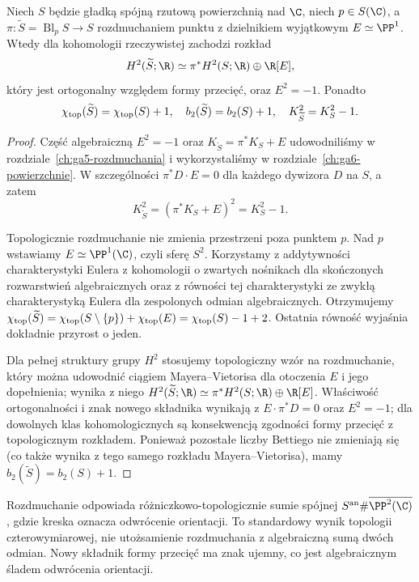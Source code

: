 \begin{twierdzenie}
\label{tw:ga10-blowup}
Niech $S$ będzie gładką spójną rzutową powierzchnią nad $\C$,
niech $p\in S(\C)$, a $\pi\colon\widetilde S=\operatorname{Bl}_pS\to S$
rozdmuchaniem punktu z dzielnikiem wyjątkowym $E\simeq\PP^1$.
Wtedy dla kohomologii rzeczywistej zachodzi rozkład
\[
 H^2(\widetilde S;\R)\simeq\pi^*H^2(S;\R)\oplus\R[E],
\]
który jest ortogonalny względem formy przecięć, oraz
$E^2=-1$. Ponadto
\[
 \chi_{\rm top}(\widetilde S)=\chi_{\rm top}(S)+1,
 \quad b_2(\widetilde S)=b_2(S)+1,
 \quad K_{\widetilde S}^2=K_S^2-1.
\]
\end{twierdzenie}
\begin{proof}
Część algebraiczną $E^2=-1$ oraz
$K_{\widetilde S}=\pi^*K_S+E$ udowodniliśmy
w rozdziale~\ref{ch:ga5-rozdmuchania} i
wykorzystaliśmy w rozdziale~\ref{ch:ga6-powierzchnie}.
W szczególności $\pi^*D\cdot E=0$ dla każdego
dywizora $D$ na $S$, a zatem
\[
 K_{\widetilde S}^2=(\pi^*K_S+E)^2=K_S^2-1.
\]

Topologicznie rozdmuchanie nie zmienia przestrzeni poza
punktem $p$. Nad $p$ wstawiamy $E\simeq\PP^1(\C)$,
czyli sferę $S^2$. Korzystamy z addytywności charakterystyki Eulera
z kohomologii o zwartych nośnikach dla skończonych
rozwarstwień algebraicznych oraz z równości tej
charakterystyki ze zwykłą charakterystyką Eulera
dla zespolonych odmian algebraicznych. Otrzymujemy
$\chi_{\rm top}(\widetilde S)
=\chi_{\rm top}(S\setminus\{p\})+\chi_{\rm top}(E)
=\chi_{\rm top}(S)-1+2$.
Ostatnia równość wyjaśnia dokładnie przyrost o jeden.

Dla pełnej struktury grupy $H^2$ stosujemy topologiczny
wzór na rozdmuchanie, który można udowodnić
ciągiem Mayera--Vietorisa dla otoczenia $E$
i jego dopełnienia; wynika z niego
$H^2(\widetilde S;\R)\simeq\pi^*H^2(S;\R)\oplus\R[E]$.
Właściwość ortogonalności i znak nowego składnika
wynikają z $E\cdot\pi^*D=0$ oraz $E^2=-1$;
dla dowolnych klas kohomologicznych są konsekwencją
zgodności formy przecięć z topologicznym rozkładem.
Ponieważ pozostałe liczby Bettiego nie zmieniają się
(co także wynika z tego samego rozkładu Mayera--Vietorisa),
mamy $b_2(\widetilde S)=b_2(S)+1$.
\end{proof}

\begin{uwaga}
Rozdmuchanie odpowiada różniczkowo-topologicznie sumie
spójnej $S^{\rm an}\#\overline{\PP^2(\C)}$,
gdzie kreska oznacza odwrócenie orientacji.
To standardowy wynik topologii czterowymiarowej,
nie utożsamienie rozdmuchania z algebraiczną sumą dwóch
odmian. Nowy składnik formy przecięć ma znak ujemny,
co jest algebraicznym śladem odwrócenia orientacji.
\end{uwaga}

